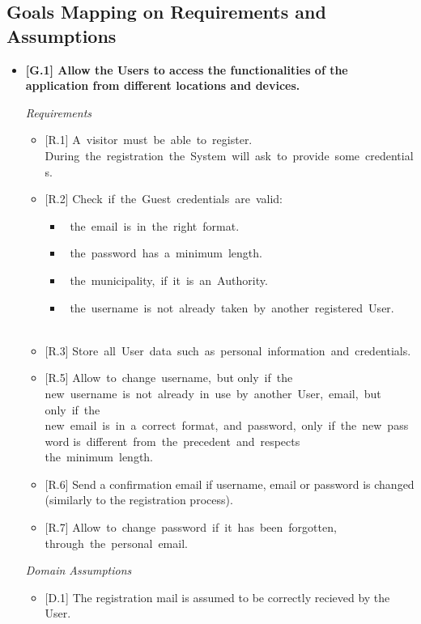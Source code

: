 \documentclass{report}
\begin{document}
\subsection{Goals Mapping on Requirements and Assumptions}
\begin{itemize}
	\item \textbf{{[G.1]} Allow the Users to access the functionalities of the application from different locations and devices.}
\begin{center}\large{\textit{Requirements}}\end{center}
	\begin{itemize}
		\item{[R.1]} 
		A visitor must be able to register. During the registration the System will ask to provide some credentials.
		\item {[R.2]} Check if the Guest credentials are valid:
	        \begin{itemize}
	            \item the email is in the right format.
	            \item the password has a minimum length.
	            \item the municipality, if it is an Authority.
	            \item the username is not already taken by another registered User.
	        \end{itemize}
		\item {[R.3]} Store all User data such as personal information and credentials.
		\item {[R.5]} 
		Allow to change username, but only if the new username is not already in use by another User, email, but only if the\\
		new email is in a correct format, and password, only if the new password is different from the precedent and respects \\ 
		the minimum length.
		\item {[R.6]} Send a confirmation email if username, email or password is changed (similarly to the registration process).
		\item {[R.7]} 
		Allow to change password if it has been forgotten, through the personal email.
	\end{itemize}
\begin{center}\large{\textit{Domain Assumptions}}\end{center}
	\begin{itemize}
		\item {[D.1]} The registration mail is assumed to be correctly recieved by the User.

\end{itemize}
\end{itemize}
\end{document}
